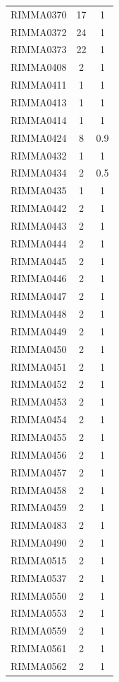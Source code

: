 \documentclass[11pt]{article}
\newcounter{rowno}
\begin{document}
\begin{scriptsize}
\begin{longtable}{>{\stepcounter{rowno}}ccc}
    RIMMA0370 & 17    & 1 \\
    RIMMA0372 & 24    & 1 \\
    RIMMA0373 & 22    & 1 \\
    RIMMA0408 & 2     & 1 \\
    RIMMA0411 & 1     & 1 \\
    RIMMA0413 & 1     & 1 \\
    RIMMA0414 & 1     & 1 \\
    RIMMA0424 & 8     & 0.9 \\
    RIMMA0432 & 1     & 1 \\
    RIMMA0434 & 2     & 0.5 \\
    RIMMA0435 & 1     & 1 \\
    RIMMA0442 & 2     & 1 \\
    RIMMA0443 & 2     & 1 \\
    RIMMA0444 & 2     & 1 \\
    RIMMA0445 & 2     & 1 \\
    RIMMA0446 & 2     & 1 \\
    RIMMA0447 & 2     & 1 \\
    RIMMA0448 & 2     & 1 \\
    RIMMA0449 & 2     & 1 \\
    RIMMA0450 & 2     & 1 \\
    RIMMA0451 & 2     & 1 \\
    RIMMA0452 & 2     & 1 \\
    RIMMA0453 & 2     & 1 \\
    RIMMA0454 & 2     & 1 \\
    RIMMA0455 & 2     & 1 \\
    RIMMA0456 & 2     & 1 \\
    RIMMA0457 & 2     & 1 \\
    RIMMA0458 & 2     & 1 \\
    RIMMA0459 & 2     & 1 \\
    RIMMA0483 & 2     & 1 \\
    RIMMA0490 & 2     & 1 \\
    RIMMA0515 & 2     & 1 \\
    RIMMA0537 & 2     & 1 \\
    RIMMA0550 & 2     & 1 \\
    RIMMA0553 & 2     & 1 \\
    RIMMA0559 & 2     & 1 \\
    RIMMA0561 & 2     & 1 \\
    RIMMA0562 & 2     & 1 \\

\end{longtable}
\end{scriptsize}
\end{document}
